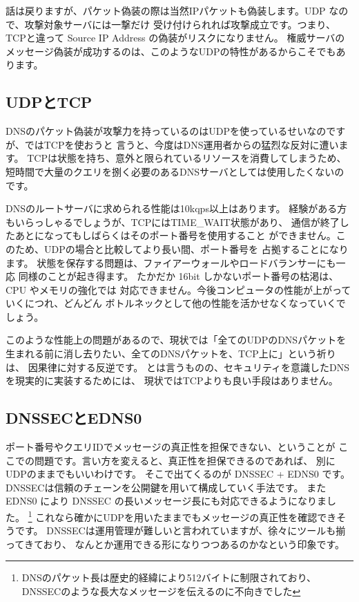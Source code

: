 話は戻りますが、パケット偽装の際は当然IPパケットも偽装します。UDP なので、攻撃対象サーバには一撃だけ
受け付けられれば攻撃成立です。つまり、TCPと違って Source IP Address の偽装がリスクになりません。
権威サーバのメッセージ偽装が成功するのは、このようなUDPの特性があるからこそでもあります。

\subsection{UDPとTCP}
DNSのパケット偽装が攻撃力を持っているのはUDPを使っているせいなのですが、ではTCPを使おうと
言うと、今度はDNS運用者からの猛烈な反対に遭います。
TCPは状態を持ち、意外と限られているリソースを消費してしまうため、
短時間で大量のクエリを捌く必要のあるDNSサーバとしては使用したくないのです。

DNSのルートサーバに求められる性能は10kqps以上はあります。
経験がある方もいらっしゃるでしょうが、TCPにはTIME\_WAIT状態があり、
通信が終了したあとになってもしばらくはそのポート番号を使用すること
ができません。このため、UDPの場合と比較してより長い間、ポート番号を
占拠することになります。
状態を保存する問題は、ファイアーウォールやロードバランサーにも一応
同様のことが起き得ます。
たかだか 16bit しかないポート番号の枯渇は、CPU やメモリの強化では
対応できません。今後コンピュータの性能が上がっていくにつれ、どんどん
ボトルネックとして他の性能を活かせなくなっていくでしょう。

このような性能上の問題があるので、現状では「全てのUDPのDNSパケットを
生まれる前に消し去りたい、全てのDNSパケットを、TCP上に」という祈りは、
因果律に対する反逆です。
とは言うものの、セキュリティを意識したDNSを現実的に実装するためには、
現状ではTCPよりも良い手段はありません。

\subsection{DNSSECとEDNS0}
ポート番号やクエリIDでメッセージの真正性を担保できない、ということが
ここでの問題です。言い方を変えると、真正性を担保できるのであれば、
別にUDPのままでもいいわけです。
そこで出てくるのが DNSSEC + EDNS0 です。
DNSSECは信頼のチェーンを公開鍵を用いて構成していく手法です。
また EDNS0 により DNSSEC の長いメッセージ長にも対応できるようになりました。
\footnote{DNSのパケット長は歴史的経緯により512バイトに制限されており、
DNSSECのような長大なメッセージを伝えるのに不向きでした}
これなら確かにUDPを用いたままでもメッセージの真正性を確認できそうです。
DNSSECは運用管理が難しいと言われていますが、徐々にツールも揃ってきており、
なんとか運用できる形になりつつあるのかなという印象です。


